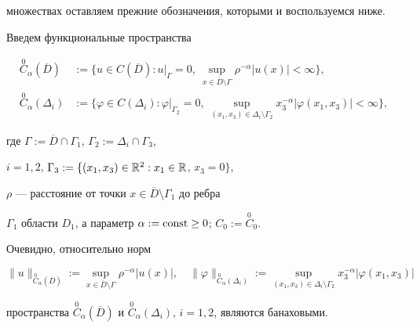 множествах оставляем прежние обозначения, которыми и воспользуемся ниже.





Введем функциональные пространства


\begin{align*}


\overset{0}{C}{}_{\alpha}(\overline D)&:=\big\{u\in C(\overline D):u


\big |_{\Gamma} = 0,\ \sup_{x \in \overline D \setminus \Gamma}


\rho^{-\alpha}|u(x)| <\infty \big\},\\


\overset{0}{C}{}_{\alpha}(\Delta_i)&:=\big\{ \varphi \in C(\Delta_i) :


\varphi \big|_{\Gamma_2} = 0,\ \sup_{(x_1,x_3) \in \Delta_i \setminus


\Gamma_2} x_3^{-\alpha}| \varphi(x_1,x_3)| < \infty \big\},


\end{align*}


где $\Gamma :=\overline D \cap \Gamma_1$, $\Gamma_2 :=\Delta_i \cap \Gamma_3$,


$i=1,2$, $\Gamma_3:=\{(x_1,x_3) \in \Bbb{R}^2:x_1 \in \Bbb{R}$, $x_3=0 \}$,


$\rho$ --- расстояние от точки $x\in \overline D \setminus \Gamma_1$ до ребра


$\Gamma_1$ области $D_1$, а параметр $\alpha := \const \geq 0$; $C_0:=


\overset{0}{C}{}_{0}$.





Очевидно, относительно норм


$$


\|u\|_{\overset{0}{C}{}_{\alpha}(\overline D)}:=


\sup_{x \in \overline D


\setminus \Gamma}\rho^{-\alpha}|u(x)|,\quad


\|\varphi\|_{\overset{0}{C}{}_{\alpha}(\Delta_i)}:=


\sup_{(x_1,x_3) \in


\Delta_i \setminus\Gamma_2} x_3^{-\alpha}|\varphi (x_1,x_3)|


$$


пространства $\overset{0}{C}{}_{\alpha}(\overline D)$ и $\overset{0}{C}{}


_{\alpha}(\Delta_i)$, $i=1,2$, являются банаховыми.





